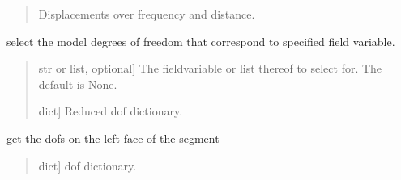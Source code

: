 \documentclass[letterpaper,10pt,english]{sphinxmanual}
\begin{document}
\begin{fulllineitems}
\begin{fulllineitems}
\begin{quote}
\begin{description}
\begin{description}
\end{description}

\begin{description}
\sphinxAtStartPar
Displacements over frequency and distance.

\end{description}

\end{description}\end{quote}

\end{fulllineitems}


\begin{fulllineitems}
\label{\detokenize{model:pywfe.Model.select_dofs}}
\pysigstartsignatures
{}
\pysigstopsignatures
\sphinxAtStartPar
select the model degrees of freedom that correspond to specified 
field variable.
\begin{quote}\begin{description}
\begin{description}
\sphinxlineitem{\sphinxstylestrong{fieldvar}}{[}str or list, optional{]}
\sphinxAtStartPar
The fieldvariable or list thereof to select for. The default is None.

\end{description}

\begin{description}
\sphinxlineitem{\sphinxstylestrong{dofs}}{[}dict{]}
\sphinxAtStartPar
Reduced dof dictionary.

\end{description}

\end{description}\end{quote}

\end{fulllineitems}


\begin{fulllineitems}
\label{\detokenize{model:pywfe.Model.left_dofs}}
\pysigstartsignatures
{}
\pysigstopsignatures
\sphinxAtStartPar
get the dofs on the left face of the segment
\begin{quote}\begin{description}
\begin{description}
\sphinxlineitem{\sphinxstylestrong{dofs}}{[}dict{]}
\sphinxAtStartPar
dof dictionary.


\end{description}
\end{description}
\end{quote}
\end{fulllineitems}
\end{fulllineitems}
\end{document}
